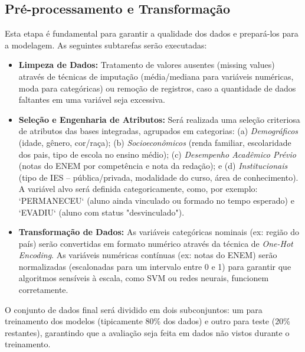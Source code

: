 \documentclass[english, brazilian]{RBIEarticle}
\begin{document}
\subsection{Pré-processamento e Transformação}
Esta etapa é fundamental para garantir a qualidade dos dados e prepará-los para a modelagem. As seguintes subtarefas serão executadas:
\begin{itemize}
    \item \textbf{Limpeza de Dados:} Tratamento de valores ausentes (missing values) através de técnicas de imputação (média/mediana para variáveis numéricas, moda para categóricas) ou remoção de registros, caso a quantidade de dados faltantes em uma variável seja excessiva.
    \item \textbf{Seleção e Engenharia de Atributos:} Será realizada uma seleção criteriosa de atributos das bases integradas, agrupados em categorias: (a) \textit{Demográficos} (idade, gênero, cor/raça); (b) \textit{Socioeconômicos} (renda familiar, escolaridade dos pais, tipo de escola no ensino médio); (c) \textit{Desempenho Acadêmico Prévio} (notas do ENEM por competência e nota da redação); e (d) \textit{Institucionais} (tipo de IES – pública/privada, modalidade do curso, área de conhecimento). A variável alvo será definida categoricamente, como, por exemplo: `PERMANECEU` (aluno ainda vinculado ou formado no tempo esperado) e `EVADIU` (aluno com status "desvinculado").
    \item \textbf{Transformação de Dados:} As variáveis categóricas nominais (ex: região do país) serão convertidas em formato numérico através da técnica de \textit{One-Hot Encoding}. As variáveis numéricas contínuas (ex: notas do ENEM) serão normalizadas (escalonadas para um intervalo entre 0 e 1) para garantir que algoritmos sensíveis à escala, como SVM ou redes neurais, funcionem corretamente.
\end{itemize}
O conjunto de dados final será dividido em dois subconjuntos: um para treinamento dos modelos (tipicamente 80\% dos dados) e outro para teste (20\% restantes), garantindo que a avaliação seja feita em dados não vistos durante o treinamento.
\end{document}
